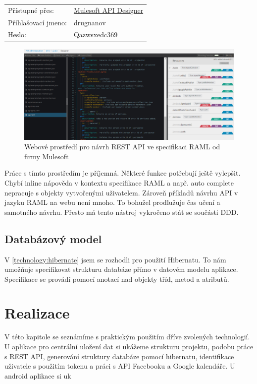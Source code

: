 \documentclass[thesis=B,czech]{FITthesis}[2012/06/26]
\begin{document}
\begin{tabular}{l l}
	Přístupné přes:&\href{''https://anypoint.mulesoft.com/#/signin''}{Mulesoft API Designer}\\
	Příhlašovací jmeno:&drugnanov\\
	Heslo:&Qazwsxedc369\\
\end{tabular}

\begin{figure}[h!]\centering
	\includegraphics[width=1\textwidth]{pictures/gtd_raml_anypoint}
	\caption{Webové prostředí pro návrh REST API ve specifikaci RAML od firmy Mulesoft}\label{fig:gtd_raml_ide}
\end{figure}

Práce s tímto prostředím je příjemná. Některé funkce potřebují ještě vylepšit. Chybí inline nápověda v kontextu specifikace RAML a např. auto complete nepracuje s objekty vytvořenými uživatelem. Zároveň příkladů návrhu API v jazyku RAML na webu není mnoho. To bohužel prodlužuje čas učení a samotného návrhu. Přesto má tento nástroj vykročeno stát se součásti DDD\cite{ws_raml_ddd}. 

\section{Databázový model}
\label{design:database_model}
V \ref{technology:hibernate} jsem se rozhodli pro použití Hibernatu. To nám umožňuje specifikovat strukturu databáze přímo v datovém modelu aplikace. Specifikace se provádí pomocí anotací nad objekty tříd, metod a atributů\cite{design_hibernate_annotations}. 


\chapter{Realizace}

V této kapitole se seznámíme s praktickým použitím dříve zvolených technologií. U aplikace pro centrální uložení dat si ukážeme strukturu projektu, podobu práce s REST API, generování struktury databáze pomocí hibernatu, identifikace uživatele s použitím tokenu a práci s API Facebooku a Google kalendáře.
U android aplikace si uk
\newpage
\end{document}
